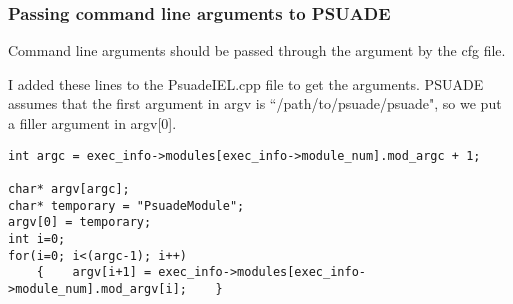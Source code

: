 \subsubsection{Passing command line arguments to PSUADE}

Command line arguments should be passed through the argument by the cfg file.

I added these lines to the PsuadeIEL.cpp file to get the arguments. PSUADE assumes that the first argument in argv is ``/path/to/psuade/psuade", so we put a filler argument in argv[0].

\begin{verbatim}
int argc = exec_info->modules[exec_info->module_num].mod_argc + 1;

char* argv[argc];
char* temporary = "PsuadeModule";
argv[0] = temporary;
int i=0;
for(i=0; i<(argc-1); i++)
    {    argv[i+1] = exec_info->modules[exec_info->module_num].mod_argv[i];    }
\end{verbatim}


